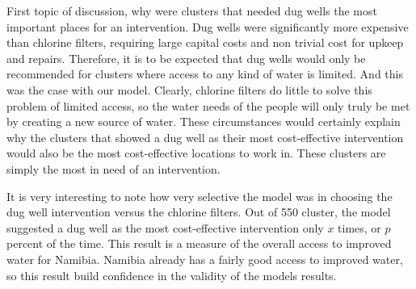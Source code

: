 First topic of discussion, why were clusters that needed dug wells the most important places for an intervention. 
Dug wells were significantly more expensive than chlorine filters, requiring large capital costs and non trivial cost for upkeep and repairs. 
Therefore, it is to be expected that dug wells would only be recommended for clusters where access to any kind of water is limited. 
And this was the case with our model.
Clearly, chlorine filters do little to solve this problem of limited access, so the water needs of the people will only truly be met by creating a new source of water. 
These circumstances would certainly explain why the clusters that showed a dug well as their most cost-effective intervention would also be the most cost-effective locations to work in. These clusters are simply the most in need of an intervention.  

It is very interesting to note how very selective the model was in choosing the dug well intervention versus the chlorine filters.
Out of 550 cluster, the model suggested a dug well as the most cost-effective intervention only $x$ times, or $p$ percent of the time.
This result is a measure of the overall access to improved water for Namibia. 
Namibia already has a fairly good access to improved water, so this result build confidence in the validity of the models results.